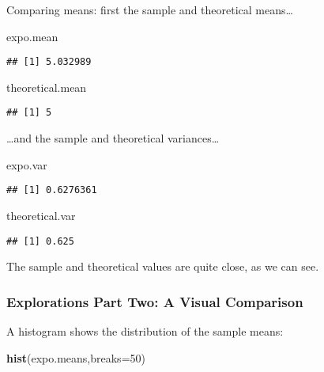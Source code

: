 \documentclass[]{article}
\newenvironment{Shaded}{\begin{snugshade}}{\end{snugshade}}
\newcommand{\KeywordTok}[1]{\textcolor[rgb]{0.13,0.29,0.53}{\textbf{#1}}}
\newcommand{\DataTypeTok}[1]{\textcolor[rgb]{0.13,0.29,0.53}{#1}}
\newcommand{\DecValTok}[1]{\textcolor[rgb]{0.00,0.00,0.81}{#1}}
\newcommand{\NormalTok}[1]{#1}
\begin{document}
Comparing means: first the sample and theoretical means\ldots{}

\begin{Shaded}
\begin{Highlighting}[]
\NormalTok{expo.mean}
\end{Highlighting}
\end{Shaded}

\begin{verbatim}
## [1] 5.032989
\end{verbatim}

\begin{Shaded}
\begin{Highlighting}[]
\NormalTok{theoretical.mean}
\end{Highlighting}
\end{Shaded}

\begin{verbatim}
## [1] 5
\end{verbatim}

\ldots{}and the sample and theoretical variances\ldots{}

\begin{Shaded}
\begin{Highlighting}[]
\NormalTok{expo.var}
\end{Highlighting}
\end{Shaded}

\begin{verbatim}
## [1] 0.6276361
\end{verbatim}

\begin{Shaded}
\begin{Highlighting}[]
\NormalTok{theoretical.var}
\end{Highlighting}
\end{Shaded}

\begin{verbatim}
## [1] 0.625
\end{verbatim}

The sample and theoretical values are quite close, as we can see.

\subsubsection{Explorations Part Two: A Visual
Comparison}\label{explorations-part-two-a-visual-comparison}

A histogram shows the distribution of the sample means:

\begin{Shaded}
\begin{Highlighting}[]
\KeywordTok{hist}\NormalTok{(expo.means,}\DataTypeTok{breaks=}\DecValTok{50}\NormalTok{)}
\end{Highlighting}
\end{Shaded}
\end{document}
